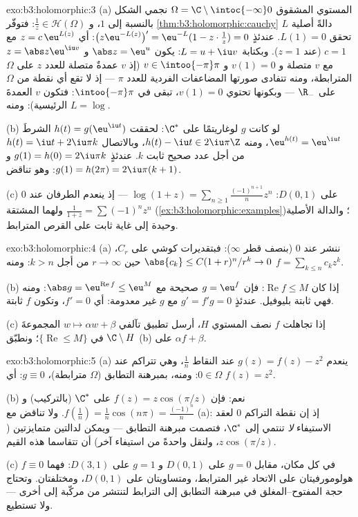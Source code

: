 \begin{solution}{exo:b3:holomorphic:3}
(a) المستوي المشقوق $\Omega = \C\setminus\intoc{-\infty}0$ نجمي الشكل بالنسبة إلى $1$، و $\frac1z \in \mathcal H(\Omega)$:
فتوفّر \cref{thm:b3:holomorphic:cauchy} دالةً أصلية $L$ تحقق $L(1) = 0$. عندئذٍ
$\bigl(z\eu^{-L(z)}\bigr)' =
\eu^{-L}(1 - z\cdot\frac1z) = 0$: أي $z = c\,\eu^{L(z)}$ مع $c
= 1$ (عند $z = 1$). وبكتابة
$L = u + \iu v$: يكون $\abs z = \eu^u$ و $z = \abs z\eu^{\iu v}$ مع $v$ متصلة
و $v(1) = 0$ و $v \in \intoo{-\pi}\pi$ (إذ $v$ عمدةٌ متصلة للعدد $z$ على
$\Omega$ المترابطة، ومنه تتفادى صورتها المضاعفات الفردية للعدد
$\pi$ --- إذ لا تقع أي نقطة من $\Omega$ على $\R_-$ --- وبكونها
تحتوي $v(1) = 0$، تبقى في $\intoo{-\pi}\pi$: فتكون $v$ العمدةَ الرئيسية):
ومنه $L = \log$.

(b) لو كانت $g$ لوغاريتمًا  على $\C^*$: لحققت $h(t) =
g(\eu^{\iu t})$
الشرطَ $\eu^{h(t)} = \eu^{\iu t}$، ومنه $h(t)
- \iu t \in 2\iu\pi\Z$، وبالاتصال $h(t) = \iu t +
2\iu\pi k$ من أجل عدد صحيح
ثابت $k$. عندئذٍ $g(1) = h(0) =
2\iu\pi k$ و $g(1) = h(2\pi) = 2\iu\pi(k + 1)$: وهو تناقض.

(c) على $D(0,1)$: $\log(1 + z) =
\sum_{n\geq1}\frac{(-1)^{n+1}}{n}z^n$ --- إذ ينعدم الطرفان عند $0$ ولهما
المشتقة $\frac1{1+z} = \sum(-1)^nz^n$ (\cref{ex:b3:holomorphic:examples})؛ والدالة الأصلية وحيدة إلى غاية ثابت
على القرص المترابط.
\end{solution}

\begin{solution}{exo:b3:holomorphic:4}
(a) ننشر عند $0$ (بنصف قطر $\infty$): فبتقديرات كوشي على $C_r$،
$\abs{c_k} \leq C(1 + r)^n/r^k \to 0$ حين $r \to
\infty$ من أجل $k > n$: ومنه $f = \sum_{k\leq n}c_kz^k$.

(b) إذا كان $\operatorname{Re}f \leq M$: فإن $g = \eu^f$ صحيحة مع $\abs g = \eu^{\operatorname{Re}f} \leq \eu^M$: ومنه فهي
ثابتة بليوفيل. عندئذٍ $g' = f'g = 0$ مع $g$ غير معدومة: أي
$f' =
0$، وتكون $f$ ثابتة.

(c) إذا تجاهلت $f$ نصف المستوي $H$، أرسل تطبيق تآلفي $w \mapsto
\alpha w + \beta$
المجموعةَ $\C\setminus H$ في $\{\operatorname{Re} \leq M\}$؛ ونطبّق (b) على $\alpha f +
\beta$.
\end{solution}

\begin{solution}{exo:b3:holomorphic:5}
(a) ينعدم $g(z) = f(z) - z^2$ عند النقاط $\frac1n$، وهي تتراكم عند
$0 \in \Omega$: ومنه، بمبرهنة التطابق ($\Omega$ مترابطة)،
$g \equiv 0$: أي $f(z) = z^2$.

(b) نعم: فإن $f(z) = z\cos(\pi/z)$  على $\C^*$ (بالتركيب) و $f(\frac1n) = \frac1n\cos(n\pi) =
\frac{(-1)^n}n$.
ولا تناقض مع (a): إذ إن نقطة التراكم $0$ لعقد الاستيفاء
\emph{لا} تنتمي إلى $\C^*$، فتصمت مبرهنة التطابق --- ويمكن
لدالتين متمايزتين ($z\cos(\pi/z)$، ولنقل واحدةً من استيفاء
آخر) أن تتقاسما هذه القيم.

(c) $f \equiv 0$ في كل مكان، مقابل $g = 0$ على $D(0,1)$
و $g = 1$ على $D(3,1)$: فهما هولومورفيتان على الاتحاد غير
المترابط، ومتساويتان على $D(0,1)$، ومختلفتان. وتحتاج حجة
المفتوح--المغلق في مبرهنة التطابق إلى الترابط لتنتشر من مركّبة
إلى أخرى --- ولا تستطيع.
\end{solution}

